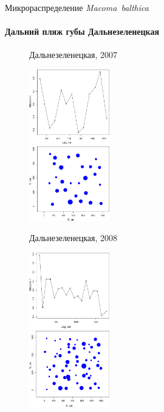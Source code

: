 \documentclass{beamer}
\begin{document}
\begin{frame}{Микрораспределение {\it Macoma~balthica}}
\framesubtitle{Дальний пляж губы Дальнезеленецкая}
\begin{figure}
	\begin{minipage}[b]{.49\linewidth}
\tiny{Дальнезеленецкая, 2007}
	\begin{center}
\includegraphics[width=35mm]{./microdistribution/Plyazh07_moran_N_Macoma_balthica_.pdf}
	\end{center}
	\end{minipage}
\hfil %
	\begin{minipage}[b]{.49\linewidth}
	\begin{center}
\includegraphics[width=35mm]{./microdistribution/Plyazh07_N_Macoma_bubbles.pdf}
	\end{center}
	\end{minipage}
	\begin{minipage}[b]{.49\linewidth}
\tiny{Дальнезеленецкая, 2008}
	\begin{center}
\includegraphics[width=35mm]{./microdistribution/Plyazh0812_moran_N_Macoma_balthica_.pdf}
	\end{center}
	\end{minipage}
\hfil %
	\begin{minipage}[b]{.49\linewidth}
	\begin{center}
\includegraphics[width=35mm]{./microdistribution/Plyazh0812_N_Macoma_bubbles.pdf}
	\end{center}
	\end{minipage}
\end{figure}
\end{frame}
\end{document}
